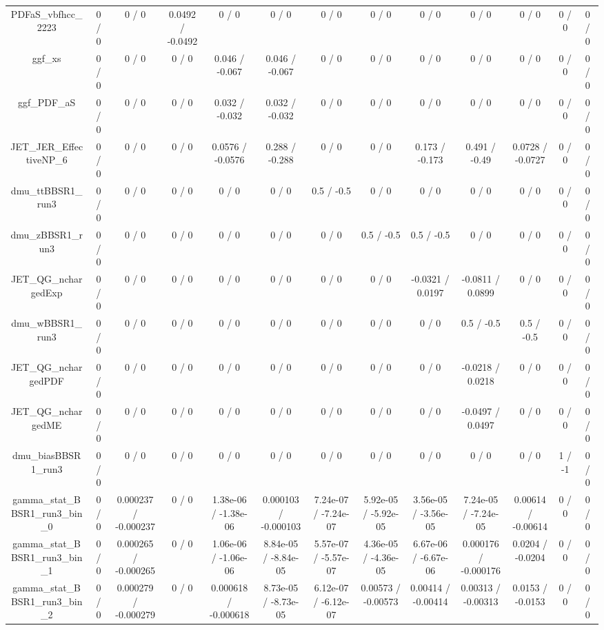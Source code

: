 \documentclass[10pt]{article}
\begin{document}
\begin{table}[htbp]
\begin{center}
\begin{tabular}{|c|c|c|c|c|c|c|c|c|c|c|c|c|}
  PDFaS_vbfhcc_2223 & 0 / 0 & 0 / 0 & 0.0492 / -0.0492 & 0 / 0 & 0 / 0 & 0 / 0 & 0 / 0 & 0 / 0 & 0 / 0 & 0 / 0 & 0 / 0 & 0 / 0 \\ 
  ggf_xs & 0 / 0 & 0 / 0 & 0 / 0 & 0.046 / -0.067 & 0.046 / -0.067 & 0 / 0 & 0 / 0 & 0 / 0 & 0 / 0 & 0 / 0 & 0 / 0 & 0 / 0 \\ 
  ggf_PDF_aS & 0 / 0 & 0 / 0 & 0 / 0 & 0.032 / -0.032 & 0.032 / -0.032 & 0 / 0 & 0 / 0 & 0 / 0 & 0 / 0 & 0 / 0 & 0 / 0 & 0 / 0 \\ 
  JET_JER_EffectiveNP_6 & 0 / 0 & 0 / 0 & 0 / 0 & 0.0576 / -0.0576 & 0.288 / -0.288 & 0 / 0 & 0 / 0 & 0.173 / -0.173 & 0.491 / -0.49 & 0.0728 / -0.0727 & 0 / 0 & 0 / 0 \\ 
  dmu_ttBBSR1_run3 & 0 / 0 & 0 / 0 & 0 / 0 & 0 / 0 & 0 / 0 & 0.5 / -0.5 & 0 / 0 & 0 / 0 & 0 / 0 & 0 / 0 & 0 / 0 & 0 / 0 \\ 
  dmu_zBBSR1_run3 & 0 / 0 & 0 / 0 & 0 / 0 & 0 / 0 & 0 / 0 & 0 / 0 & 0.5 / -0.5 & 0.5 / -0.5 & 0 / 0 & 0 / 0 & 0 / 0 & 0 / 0 \\ 
  JET_QG_nchargedExp & 0 / 0 & 0 / 0 & 0 / 0 & 0 / 0 & 0 / 0 & 0 / 0 & 0 / 0 & -0.0321 / 0.0197 & -0.0811 / 0.0899 & 0 / 0 & 0 / 0 & 0 / 0 \\ 
  dmu_wBBSR1_run3 & 0 / 0 & 0 / 0 & 0 / 0 & 0 / 0 & 0 / 0 & 0 / 0 & 0 / 0 & 0 / 0 & 0.5 / -0.5 & 0.5 / -0.5 & 0 / 0 & 0 / 0 \\ 
  JET_QG_nchargedPDF & 0 / 0 & 0 / 0 & 0 / 0 & 0 / 0 & 0 / 0 & 0 / 0 & 0 / 0 & 0 / 0 & -0.0218 / 0.0218 & 0 / 0 & 0 / 0 & 0 / 0 \\ 
  JET_QG_nchargedME & 0 / 0 & 0 / 0 & 0 / 0 & 0 / 0 & 0 / 0 & 0 / 0 & 0 / 0 & 0 / 0 & -0.0497 / 0.0497 & 0 / 0 & 0 / 0 & 0 / 0 \\ 
  dmu_biasBBSR1_run3 & 0 / 0 & 0 / 0 & 0 / 0 & 0 / 0 & 0 / 0 & 0 / 0 & 0 / 0 & 0 / 0 & 0 / 0 & 0 / 0 & 1 / -1 & 0 / 0 \\ 
  gamma_stat_BBSR1_run3_bin_0 & 0 / 0 & 0.000237 / -0.000237 & 0 / 0 & 1.38e-06 / -1.38e-06 & 0.000103 / -0.000103 & 7.24e-07 / -7.24e-07 & 5.92e-05 / -5.92e-05 & 3.56e-05 / -3.56e-05 & 7.24e-05 / -7.24e-05 & 0.00614 / -0.00614 & 0 / 0 & 0 / 0 \\ 
  gamma_stat_BBSR1_run3_bin_1 & 0 / 0 & 0.000265 / -0.000265 & 0 / 0 & 1.06e-06 / -1.06e-06 & 8.84e-05 / -8.84e-05 & 5.57e-07 / -5.57e-07 & 4.36e-05 / -4.36e-05 & 6.67e-06 / -6.67e-06 & 0.000176 / -0.000176 & 0.0204 / -0.0204 & 0 / 0 & 0 / 0 \\ 
  gamma_stat_BBSR1_run3_bin_2 & 0 / 0 & 0.000279 / -0.000279 & 0 / 0 & 0.000618 / -0.000618 & 8.73e-05 / -8.73e-05 & 6.12e-07 / -6.12e-07 & 0.00573 / -0.00573 & 0.00414 / -0.00414 & 0.00313 / -0.00313 & 0.0153 / -0.0153 & 0 / 0 & 0 / 0 \\ 

\end{tabular}
\end{center}
\end{table}
\end{document}
